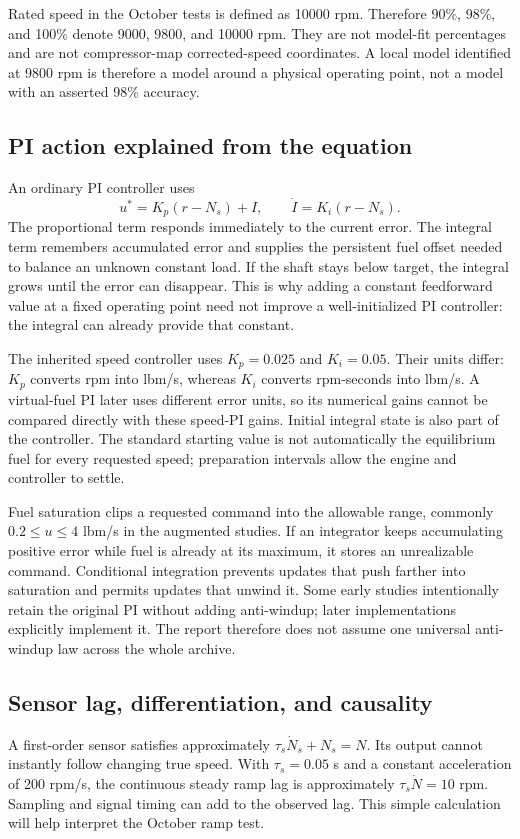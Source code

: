 Rated speed in the October tests is defined as 10000 rpm. Therefore 90\%, 98\%, and 100\% denote 9000, 9800, and 10000 rpm. They are not model-fit percentages and are not compressor-map corrected-speed coordinates. A local model identified at 9800 rpm is therefore a model around a physical operating point, not a model with an asserted 98\% accuracy.

\subsection{PI action explained from the equation}
An ordinary PI controller uses
\begin{equation}u^*=K_p(r-N_s)+I,\qquad \dot I=K_i(r-N_s).
\end{equation}
The proportional term responds immediately to the current error. The integral term remembers accumulated error and supplies the persistent fuel offset needed to balance an unknown constant load. If the shaft stays below target, the integral grows until the error can disappear. This is why adding a constant feedforward value at a fixed operating point need not improve a well-initialized PI controller: the integral can already provide that constant.

The inherited speed controller uses $K_p=0.025$ and $K_i=0.05$. Their units differ: $K_p$ converts rpm into lbm/s, whereas $K_i$ converts rpm-seconds into lbm/s. A virtual-fuel PI later uses different error units, so its numerical gains cannot be compared directly with these speed-PI gains. Initial integral state is also part of the controller. The standard starting value is not automatically the equilibrium fuel for every requested speed; preparation intervals allow the engine and controller to settle.

Fuel saturation clips a requested command into the allowable range, commonly $0.2\le u\le4$ lbm/s in the augmented studies. If an integrator keeps accumulating positive error while fuel is already at its maximum, it stores an unrealizable command. Conditional integration prevents updates that push farther into saturation and permits updates that unwind it. Some early studies intentionally retain the original PI without adding anti-windup; later implementations explicitly implement it. The report therefore does not assume one universal anti-windup law across the whole archive.

\subsection{Sensor lag, differentiation, and causality}
A first-order sensor satisfies approximately $\tau_s\dot N_s+N_s=N$. Its output cannot instantly follow changing true speed. With $\tau_s=0.05$ s and a constant acceleration of 200 rpm/s, the continuous steady ramp lag is approximately $\tau_s\dot N=10$ rpm. Sampling and signal timing can add to the observed lag. This simple calculation will help interpret the October ramp test.

